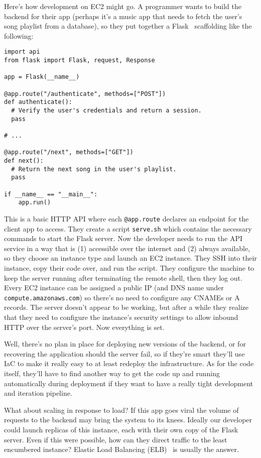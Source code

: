 \documentclass{article}
\newcommand{\icode}[1]{\texttt{#1}}
\begin{document}
Here's how development on EC2 might go.
A programmer wants to build the backend for their app (perhaps it's a music app that needs to fetch the user's song playlist from a database), so they put together a Flask~\cite{flask} scaffolding like the following:

\begin{verbatim}
import api
from flask import Flask, request, Response

app = Flask(__name__)

@app.route("/authenticate", methods=["POST"])
def authenticate():
  # Verify the user's credentials and return a session.
  pass

# ...

@app.route("/next", methods=["GET"])
def next():
  # Return the next song in the user's playlist.
  pass

if __name__ == "__main__":
    app.run()
\end{verbatim}

This is a basic HTTP API where each \icode{@app.route} declares an endpoint for the client app to access.
They create a script \texttt{serve.sh} which contains the necessary commands to start the Flask server.
Now the developer needs to run the API service in a way that is (1) accessible over the internet and (2) always available, so they choose an instance type and launch an EC2 instance.
They SSH into their instance, copy their code over, and run the script.
They configure the machine to keep the server running after terminating the remote shell, then they log out.
Every EC2 instance can be assigned a public IP (and DNS name under \texttt{compute.amazonaws.com}) so there's no need to configure any CNAMEs or A records.
The server doesn't appear to be working, but after a while they realize that they need to configure the instance's security settings to allow inbound HTTP over the server's port.
Now everything is set.

Well, there's no plan in place for deploying new versions of the backend, or for recovering the application should the server fail, so if they're smart they'll use IaC to make it really easy to at least redeploy the infrastructure.
As for the code itself, they'll have to find another way to get the code up and running automatically during deployment if they want to have a really tight development and iteration pipeline.

What about scaling in response to load?
If this app goes viral the volume of requests to the backend may bring the system to its knees.
Ideally our developer could launch replicas of this instance, each with their own copy of the Flask server.
Even if this were possible, how can they direct traffic to the least encumbered instance?
Elastic Load Balancing (ELB)~\cite{ELB} is usually the answer.
\end{document}
